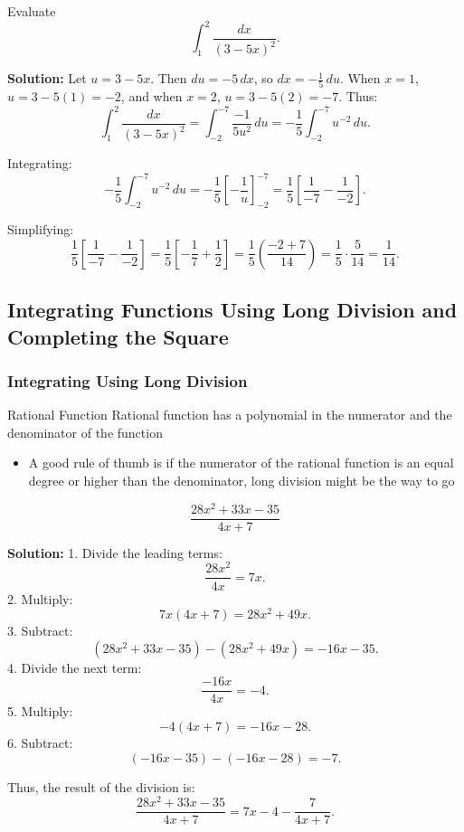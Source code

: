 \documentclass[12pt]{article}
\theoremstyle{beautifulthm}
\begin{document}
\begin{tcolorbox}[colback=examplebg, colframe=red!75!black, title=\textbf{EXAMPLE 6: Find the Integral of the Function}, fonttitle=\bfseries, sharp corners]
Evaluate 
\[
\int_1^2 \frac{dx}{(3 - 5x)^2}.
\]


\tcblower
\textbf{Solution:} 
Let $u = 3 - 5x$. Then $du = -5 \, dx$, so $dx = -\frac{1}{5} \, du$. When $x = 1$, $u = 3 - 5(1) = -2$, and when $x = 2$, $u = 3 - 5(2) = -7$. Thus:
\[
\int_1^2 \frac{dx}{(3 - 5x)^2} = \int_{-2}^{-7} \frac{-1}{5u^2} \, du = -\frac{1}{5} \int_{-2}^{-7} u^{-2} \, du.
\]

Integrating:
\[
-\frac{1}{5} \int_{-2}^{-7} u^{-2} \, du = -\frac{1}{5} \left[ -\frac{1}{u} \right]_{-2}^{-7} = \frac{1}{5} \left[ \frac{1}{-7} - \frac{1}{-2} \right].
\]

Simplifying:
\[
\frac{1}{5} \left[ \frac{1}{-7} - \frac{1}{-2} \right] = \frac{1}{5} \left[ -\frac{1}{7} + \frac{1}{2} \right] = \frac{1}{5} \left( \frac{-2 + 7}{14} \right) = \frac{1}{5} \cdot \frac{5}{14} = \frac{1}{14}.
\]
\end{tcolorbox}


\subsection{Integrating Functions Using Long Division and Completing the Square}
\subsubsection{Integrating Using Long Division}

\begin{Note}{Rational Function}{}
 Rational function has a polynomial in the numerator and the denominator of the function

\begin{itemize}
 \item A good rule of thumb is if the numerator of the rational function is an equal degree or higher than the denominator, long division might be the way to go
\end{itemize}
\end{Note}

\begin{tcolorbox}[colback=examplebg, colframe=red!75!black, title=\textbf{EXAMPLE 1: Use Long Division to Simplify the Function}, fonttitle=\bfseries, sharp corners]
\[
\frac{28x^2 + 33x - 35}{4x + 7}
\]


\tcblower
\textbf{Solution:} 
1. Divide the leading terms:
   \[
   \frac{28x^2}{4x} = 7x.
   \]
2. Multiply:
   \[
   7x(4x + 7) = 28x^2 + 49x.
   \]
3. Subtract:
   \[
   (28x^2 + 33x - 35) - (28x^2 + 49x) = -16x - 35.
   \]
4. Divide the next term:
   \[
   \frac{-16x}{4x} = -4.
   \]
5. Multiply:
   \[
   -4(4x + 7) = -16x - 28.
   \]
6. Subtract:
   \[
   (-16x - 35) - (-16x - 28) = -7.
   \]

Thus, the result of the division is:
\[
\frac{28x^2 + 33x - 35}{4x + 7} = 7x - 4 - \frac{7}{4x + 7}.
\]

\end{tcolorbox}
\end{document}
